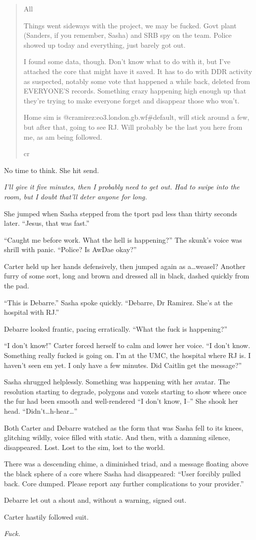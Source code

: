 \begin{quote}
All

Things went sideways with the project, we may be fucked. Govt plant (Sanders, if you remember, Sasha) and SRB spy on the team. Police showed up today and everything, just barely got out.

I found some data, though. Don't know what to do with it, but I've attached the core that might have it saved. It has to do with DDR activity as suspected, notably some vote that happened a while back, deleted from EVERYONE'S records. Something crazy happening high enough up that they're trying to make everyone forget and disappear those who won't.

Home sim is @cramirez:eo3.london.gb.wf\#default, will stick around a few, but after that, going to see RJ. Will probably be the last you here from me, as am being followed.

cr
\end{quote}

No time to think. She hit send.

\emph{I'll give it five minutes, then I probably need to get out. Had to swipe into the room, but I doubt that'll deter anyone for long.}

She jumped when Sasha stepped from the tport pad less than thirty seconds later. ``Jesus, that was fast.''

``Caught me before work. What the hell is happening?'' The skunk's voice was shrill with panic. ``Police? Is AwDae okay?''

Carter held up her hands defensively, then jumped again as a\ldots{}weasel? Another furry of some sort, long and brown and dressed all in black, dashed quickly from the pad.

``This is Debarre.'' Sasha spoke quickly. ``Debarre, Dr Ramirez. She's at the hospital with RJ.''

Debarre looked frantic, pacing erratically. ``What the fuck is happening?''

``I don't know!'' Carter forced herself to calm and lower her voice. ``I don't know. Something really fucked is going on. I'm at the UMC, the hospital where RJ is. I haven't seen em yet. I only have a few minutes. Did Caitlin get the message?''

Sasha shrugged helplessly. Something was happening with her avatar. The resolution starting to degrade, polygons and voxels starting to show where once the fur had been smooth and well-rendered ``I don't know, I--'' She shook her head. ``Didn't\ldots{}h-hear\ldots{}''

Both Carter and Debarre watched as the form that was Sasha fell to its knees, glitching wildly, voice filled with static. And then, with a damning silence, disappeared. Lost. Lost to the sim, lost to the world.

There was a descending chime, a diminished triad, and a message floating above the black sphere of a core where Sasha had disappeared: ``User forcibly pulled back. Core dumped. Please report any further complications to your provider.''

Debarre let out a shout and, without a warning, signed out.

Carter hastily followed suit.

\emph{Fuck.}
